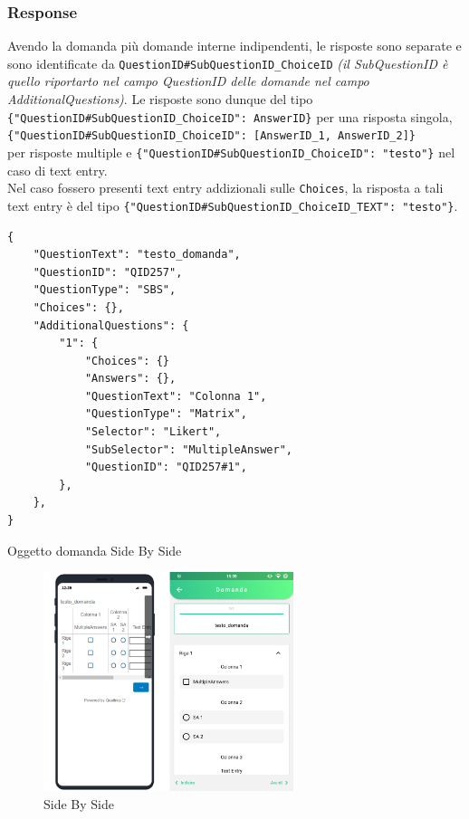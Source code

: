 \subsubsection{Response}
Avendo la domanda più domande interne indipendenti, le risposte sono separate e sono identificate da \texttt{QuestionID\#SubQuestionID\_ChoiceID} \textit{(il SubQuestionID è quello riportarto nel campo QuestionID delle domande nel campo AdditionalQuestions)}. Le risposte sono dunque del tipo\\ \texttt{\{"QuestionID\#SubQuestionID\_ChoiceID": AnswerID\}} per una risposta singola, \texttt{\{"QuestionID\#SubQuestionID\_ChoiceID": [AnswerID\_1, AnswerID\_2]\}}\\ per risposte multiple e \texttt{\{"QuestionID\#SubQuestionID\_ChoiceID": "testo"\}} nel caso di text entry. \\
Nel caso fossero presenti text entry addizionali sulle \texttt{Choices}, la risposta a tali text entry è del tipo \texttt{\{"QuestionID\#SubQuestionID\_ChoiceID\_TEXT": "testo"\}}.

\newpage
\begin{json}
\begin{verbatim}
{
    "QuestionText": "testo_domanda",
    "QuestionID": "QID257",
    "QuestionType": "SBS",
    "Choices": {},
    "AdditionalQuestions": {
        "1": {
            "Choices": {}
            "Answers": {},
            "QuestionText": "Colonna 1",
            "QuestionType": "Matrix",
            "Selector": "Likert",
            "SubSelector": "MultipleAnswer",
            "QuestionID": "QID257#1",
        },
    },
}
\end{verbatim}
\caption{Oggetto domanda Side By Side}
\label{json:sbs}
\end{json}

\begin{figure}[h!]
\centering
\includegraphics[width=0.65\textwidth]{img/sbs}
\caption{Side By Side}
\label{fig:sbs}
\end{figure}

